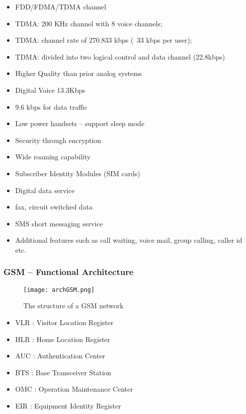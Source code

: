 \begin{itemize}
\item FDD/FDMA/TDMA channel
\item TDMA: 200 KHz channel with 8 voice channels;
\item TDMA: channel rate of 270.833 kbps (~33 kbps per user);
\item TDMA: divided into two logical control and data channel (22.8kbps)
\item Higher Quality than prior analog systems
\item Digital Voice 13.3Kbps
\item 9.6 kbps for data traffic
\item Low power handsets – support sleep mode
\item Security through encryption
\item Wide roaming capability
\item Subscriber Identity Modules (SIM cards)
\item Digital data service
\item fax, circuit switched data
\item SMS short messaging service
\item Additional features such as call waiting, voice mail, group calling,
caller id etc.
\end{itemize}

\subsubsection{GSM – Functional Architecture}

\begin{figure}[H]
  \centering
  \texttt{[image: archGSM.png]}
  \caption{The structure of a GSM network}
  \label{fig:archGSM}
\end{figure}

\begin{itemize}
\item VLR : Visitor Location Register
\item HLR : Home Location Register
\item AUC : Authentication Center
\item BTS : Base Transceiver Station
\item OMC : Operation Maintenance Center
\item EIR : Equipment Identity Register
\end{itemize}
